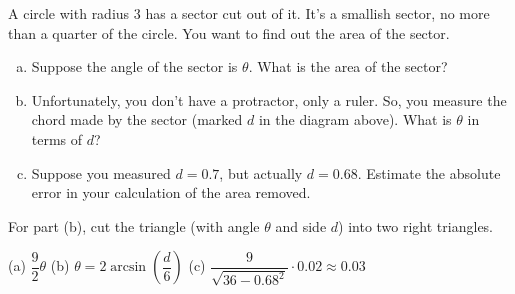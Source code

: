 \begin{question}
A circle with radius 3 has a sector cut out of it. It's a smallish sector, no more than a quarter of the circle.
You want to find out the area of the sector.
\begin{center}\end{center}

\begin{enumerate}[(a)]
\item
Suppose the angle of the sector is $\theta$. What is the area of the sector?
\item Unfortunately, you don't have a protractor, only a ruler. So, you measure the chord made by the sector (marked $d$ in the diagram above). What is $\theta$ in terms of $d$?
\item Suppose you measured $d=0.7$, but actually $d=0.68$. Estimate the absolute error in your calculation of the area removed.
\end{enumerate}
\end{question}
\begin{hint}
For part (b), cut the triangle (with angle $\theta$ and side $d$) into two right triangles.
\end{hint}
\begin{answer}
(a) $\dfrac{9}{2}\theta$\qquad
(b) $\theta = 2\arcsin\left(\dfrac{d}{6}\right)$\qquad
(c) $\dfrac{9}{\sqrt{36-0.68^2}}\cdot0.02\approx 0.03$
\end{answer}
